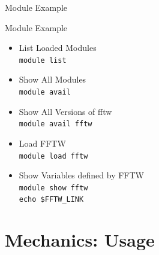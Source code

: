 \documentclass[handout]{beamer}
\begin{document}
\begin{frame}{Module Example}
 \begin{block}{Module Example}
  \begin{itemize}
    \item<1-> List Loaded Modules
         \\ \texttt{module list}
    \item<2-> Show All Modules
         \\ \texttt{module avail}
    \item<3-> Show All Versions of fftw
         \\ \texttt{module avail fftw}
    \item<4-> Load FFTW
         \\ \texttt{module load fftw}
    \item<5-> Show Variables defined by FFTW 
         \\ \texttt{module show fftw}
         \\ \texttt{echo \$FFTW\_LINK}
  \end{itemize}
 \end{block}
\end{frame}
 

  \section{Mechanics: Usage}
\end{document}
